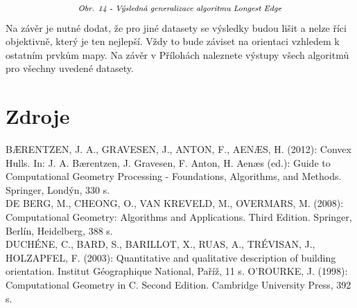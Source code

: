 \documentclass{article}
\begin{document}
\[\textit{\footnotesize{Obr. 14 - Výsledná generalizace algoritmu Longest Edge}}\\\]
Na závěr je nutné dodat, že pro jiné datasety se výsledky budou lišit a nelze říci objektivně, který je ten nejlepší. Vždy to bude záviset na orientaci vzhledem k ostatním prvkům mapy. Na závěr v Přílohách naleznete výstupy všech algoritmů pro všechny uvedené datasety.
\clearpage
\newpage
\section{\large{Zdroje}}
BÆRENTZEN, J. A., GRAVESEN, J., ANTON, F., AENÆS, H. (2012): Convex Hulls. In: J. A. Bærentzen, J. Gravesen, F. Anton, H. Aenæs (ed.): Guide to Computational Geometry Processing - Foundations, Algorithms, and Methods. Springer, Londýn, 330 s.\\
DE BERG, M., CHEONG, O., VAN KREVELD, M., OVERMARS, M. (2008): Computational Geometry: Algorithms and Applications. Third Edition. Springer, Berlín, Heidelberg, 388 s.\\
DUCHÉNE, C., BARD, S., BARILLOT, X., RUAS, A., TRÉVISAN, J., HOLZAPFEL, F. (2003): Quantitative and qualitative description of building orientation. Institut Géographique National, Paříž, 11 s.
O'ROURKE, J. (1998): Computational Geometry in C. Second Edition. Cambridge University Press, 392 s.\\
\end{document}
